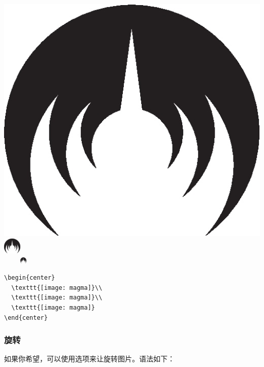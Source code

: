 \begin{codelist}[]{
    \begin{center} 
    \includegraphics[scale=0.2]{img/magma}\\
    \includegraphics[width=8.5mm]{img/magma}\\
    \includegraphics[width=2cm,
                    height=3mm]{img/magma}
    \end{center}
}
\begin{verbatim}
\begin{center}
  \texttt{[image: magma]}\\
  \texttt{[image: magma]}\\
  \texttt{[image: magma]}
\end{center}\end{verbatim}
\end{codelist}

\subsubsection{旋转}

如果你希望，可以使用选项来让旋转图片。语法如下：

